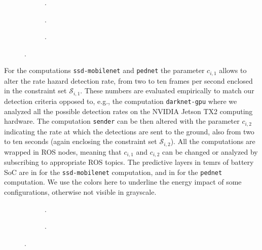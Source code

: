 \begin{figure}[h!]
  \centering
  \selectfont
  \footnotesize    
  \begin{subfigure}[b]{0.32\textwidth}
    \centering
    
    \caption{.}
    \label{fig:max-qos}
  \end{subfigure}
  \begin{subfigure}[b]{0.32\textwidth}
    \centering
    
    \caption{.}
    \label{fig:pednet}
  \end{subfigure}
  \begin{subfigure}[b]{0.32\textwidth}
    \centering
    
    \caption{.}
    \label{fig:mobilenet}
  \end{subfigure}
  \caption{.}
  \label{fig:computational}
\end{figure}
For the computations {\small\tt ssd-mobilenet} and {\small\tt pednet} the parameter $c_{i,1}$ allows to alter the rate hazard detection rate, from two to ten frames per second enclosed in the constraint set $\mathcal{S}_{i,1}$. These numbers are evaluated empirically to match our detection criteria opposed to, e.g., the computation {\small\tt darknet-gpu} where we analyzed all the possible detection rates on the NVIDIA Jetson TX2 computing hardware. The computation {\small\tt sender} can be then altered with the parameter $c_{i,2}$ indicating the rate at which the detections are sent to the ground, also from two to ten seconds (again enclosing the constraint set $\mathcal{S}_{i,2}$). All the computations are wrapped in ROS nodes, meaning that $c_{i,1}$ and $c_{i,2}$ can be changed or analyzed by subscribing to appropriate ROS topics. The predictive layers in temrs of battery SoC are in  for the {\small\tt ssd-mobilenet} computation, and in  for the {\small\tt pednet} computation. We use the colors here to underline the energy impact of some configurations, otherwise not visible in grayscale.
\begin{figure}[h!]
  \centering
  \selectfont
  \footnotesize
  \begin{subfigure}[c]{0.43\textwidth}
    \centering
    
    \caption{.}
    \label{fig:cruise-energy}
  \end{subfigure}
  \begin{subfigure}[c]{0.43\textwidth}
    \centering
    
    \caption{.}
    \label{fig:cruise-merge}
  \end{subfigure}
  \caption{.}
  \label{fig:cruise-energies}
\end{figure}
